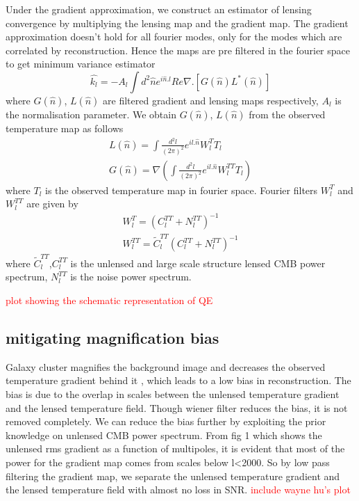 \documentclass[usenatbib, twocolumn, nofootinbib, reprint, emulateapj, amsart]{revtex4-1}
\newcommand{\pending}[1]{\textcolor{red}{#1}}
\begin{document}
 Under the gradient approximation, we construct an estimator of lensing convergence by multiplying the lensing map and the gradient map.
The gradient approximation doesn't hold for all fourier modes, only for the modes which are correlated by reconstruction.
Hence the maps are pre filtered in the fourier space to get minimum variance estimator
 \begin{equation}
 \hat{k_{l}} = -A_{l} \int d^{2} \hat{n} e^{i\hat{n}.l} Re{\nabla .[G(\hat{n}) L^{*}(\hat{n})]}
 \end{equation}
 where $G(\hat{n})$, $L(\hat{n})$ are filtered gradient and lensing maps respectively, $A_{l}$ is the normalisation parameter.
  We obtain $G(\hat{n})$, $L(\hat{n})$ from the observed temperature map as follows
  \begin{eqnarray}
  L(\hat{n}) = \int \frac{d^{2}l}{(2\pi)^{2}} e^{il .\hat{n}} W^{T}_{l} T_{l}\\
  G(\hat{n}) = \nabla (\int\frac{d^{2}l}{(2\pi)^{2}} e^{il .\hat{n}} W^{TT}_{l} T_{l}   )
  \end{eqnarray}
 where $T_{l}$ is the observed temperature map in fourier space.  
 Fourier filters $W^{T}_{l}$ and $W^{TT}_{l}$ are given by 
 \begin{eqnarray}
 W^{T}_{l} = (C^{TT}_{l} + N^{TT}_{l})^{-1}\\
 W^{TT}_{l} =  \widetilde{C}^{TT}_{l}(C^{TT}_{l} + N^{TT}_{l})^{-1}
 \end{eqnarray}
 where  $\widetilde{C}^{TT}_{l}$,$C^{TT}_{l} $  is the unlensed and large scale structure lensed CMB power spectrum, $ N^{TT}_{l}$ is the noise power spectrum.
 
 \pending{plot showing the schematic representation of QE}
 
 \subsection{mitigating magnification bias}
Galaxy cluster magnifies the background image and decreases the observed temperature gradient behind it , which leads to a low bias in reconstruction.
The bias is due to the overlap in scales between the unlensed temperature gradient and the lensed temperature field. 
Though wiener filter reduces the bias, it is not removed completely.
We can reduce the bias further by exploiting the prior knowledge on unlensed CMB power spectrum.
 From fig 1 which shows the unlensed rms gradient as a function of multipoles, it is evident that most of the power for the gradient map comes from scales below l<2000.
 So by low pass filtering the gradient map, we separate the unlensed temperature gradient and the lensed temperature field with almost no loss in SNR.
 \pending{include wayne hu's plot}
 
\end{document}
